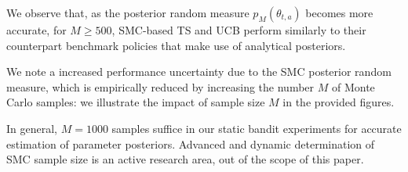 We observe that, as the posterior random measure $p_M(\theta_{t,a})$ becomes more accurate, \eg for $M\geq 500$,
SMC-based TS and UCB perform similarly to their counterpart benchmark policies that make use of analytical posteriors.

We note a increased performance uncertainty due to the SMC posterior random measure,
which is empirically reduced by increasing the number $M$ of Monte Carlo samples:
we illustrate the impact of sample size $M$ in the provided figures.

In general, $M=1000$ samples suffice in our static bandit experiments for accurate estimation of parameter posteriors.
Advanced and dynamic determination of SMC sample size is an active research area, out of the scope of this paper.



\clearpage


\clearpage

